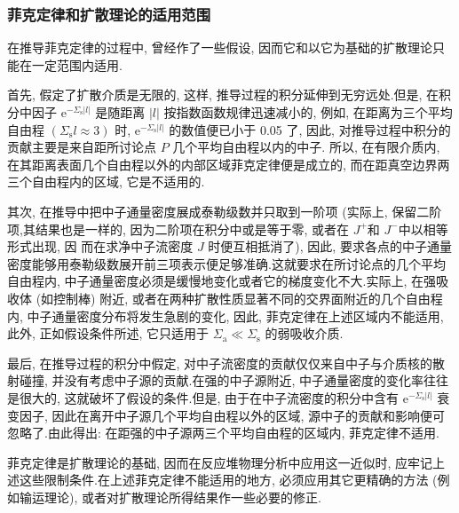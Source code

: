 \documentclass{Sichuan Normal University}
\begin{document}
\subsubsection{菲克定律和扩散理论的适用范围} 

在推导菲克定律的过程中, 曾经作了一些假设, 因而它和以它为基础的扩散理论只能在一定范围内适用.

首先, 假定了扩散介质是无限的, 这样, 推导过程的积分延伸到无穷远处.但是, 在积分中因子 $\mathrm{e}^{-\Sigma_{\mathrm{s}}|l|}$ 是随距离 $|l|$ 按指数函数规律迅速减小的, 例如, 在距离为三个平均自由程 $\left(\Sigma_{\mathrm{s}} l \approx 3\right)$ 时, $\mathrm{e}^{-\Sigma_{\mathrm{s}}|l|}$ 的数值便已小于 0.05 了, 因此, 对推导过程中积分的贡献主要是来自距所讨论点 $P$ 几个平均自由程以内的中子.
所以, 在有限介质内, 在其距离表面几个自由程以外的内部区域菲克定律便是成立的, 而在距真空边界两三个自由程内的区域, 它是不适用的.

其次, 在推导中把中子通量密度展成泰勒级数并只取到一阶项 (实际上, 保留二阶项,其结果也是一样的, 因为二阶项在积分中或是等于零, 或者在 $J^{+}$和 $J^{-}$中以相等形式出现, 因
而在求净中子流密度 $J$ 时便互相抵消了), 因此, 要求各点的中子通量密度能够用泰勒级数展开前三项表示便足够准确.这就要求在所讨论点的几个平均自由程内, 中子通量密度必须是缓慢地变化或者它的梯度变化不大.实际上, 在强吸收体 (如控制棒) 附近, 或者在两种扩散性质显著不同的交界面附近的几个自由程内, 中子通量密度分布将发生急剧的变化, 因此, 菲克定律在上述区域内不能适用, 此外, 正如假设条件所述, 它只适用于 $\Sigma_{\mathrm{a}} \ll \Sigma_{\mathrm{s}}$ 的弱吸收介质.

最后, 在推导过程的积分中假定, 对中子流密度的贡献仅仅来自中子与介质核的散射碰撞, 并没有考虑中子源的贡献.在强的中子源附近, 中子通量密度的变化率往往是很大的, 这就破坏了假设的条件.但是, 由于在中子流密度的积分中含有 $\mathrm{e}^{-\Sigma_{\mathrm{s}}|l|}$ 衰变因子, 因此在离开中子源几个平均自由程以外的区域, 源中子的贡献和影响便可忽略了.由此得出: 在距强的中子源两三个平均自由程的区域内, 菲克定律不适用.

菲克定律是扩散理论的基础, 因而在反应堆物理分析中应用这一近似时, 应牢记上述这些限制条件.在上述菲克定律不能适用的地方, 必须应用其它更精确的方法 (例如输运理论), 或者对扩散理论所得结果作一些必要的修正.
\end{document}
